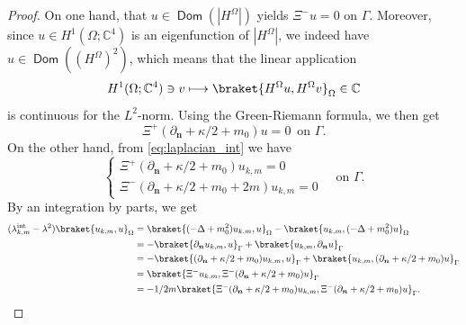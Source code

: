 \documentclass[10pt]{amsart}
\newcommand\mto{\mathchoice{\longmapsto}{\mapsto}{\mapsto}{\mapsto}}
\newcommand{\intt}{\mathrm{int}}
\theoremstyle{plain}
\theoremstyle{definition}
\newcommand{\CC}{\mathbb{C}}
\newcommand{\bn}{{\boldsymbol n}}
\let\pa\partial
\DeclareMathOperator{\Dom}{\mathsf{Dom}}
\begin{document}
\begin{proof}
On one hand, that $u\in \Dom(|H^\Omega|)$ yields
$\Xi^- u = 0$ on $\Gamma$. Moreover, since $u\in H^1(\Omega; \CC^4)$ is an eigenfunction of $|H^\Omega|$, we indeed have $u\in \Dom((H^\Omega)^2)$, which means that the linear application
$$ H^1(\Omega; \CC^4)\ni v\mto \braket{H^\Omega u,H^\Omega v}_\Omega\in\CC$$is continuous for the $L^2$-norm. Using the Green-Riemann formula, we then get
$$\Xi^+ (\pa_\bn + \kappa/2+m_0)u = 0\,\mbox{ on }\Gamma.$$ On the other hand, from \eqref{eq:laplacian_int} we have
\[
\begin{cases}
\Xi^+ (\pa_\bn + \kappa/2+m_0)u_{k,m} = 0\\
\Xi^-(\pa_\bn + \kappa/2+m_0+2m)u_{k,m} = 0
\end{cases}\quad\mbox{on }\Gamma.
\]
By an integration by parts, we get
\begin{align*}
(\lambda_{k,m}^\intt-\lambda^2)\braket{u_{k,m},u}_{\Omega}
&= \braket{(-\Delta+m_0^2) u_{k,m},u}_\Omega - \braket{u_{k,m},(-\Delta+m_0^2) u}_\Omega
\\&= -\braket{\pa_\bn u_{k,m},u}_\Gamma +\braket{u_{k,m},\pa_\bn u}_\Gamma
\\&= -\braket{(\pa_\bn+\kappa/2+m_0) u_{k,m},u}_\Gamma +\braket{u_{k,m},(\pa_\bn + \kappa/2+m_0) u}_\Gamma
\\&= \braket{\Xi^-u_{k,m},\Xi^-(\pa_\bn + \kappa/2+m_0) u}_\Gamma
\\&= -1/2m\braket{\Xi^-(\pa_\bn + \kappa/2+m_0)u_{k,m},\Xi^-(\pa_\bn + \kappa/2+m_0) u}_\Gamma.
\end{align*}
\end{proof}
\end{document}
